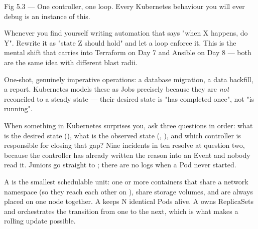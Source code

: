 \begin{wbfigure}{Fig 5.3 — One controller, one loop. Every Kubernetes behaviour you will ever debug is an instance of this.}
\end{wbfigure}

 Whenever you find yourself writing automation that says "when X happens, do Y". Rewrite it as "state Z should hold" and let a loop enforce it. This is the mental shift that carries into Terraform on Day 7 and Ansible on Day 8 --- both are the same idea with different blast radii.

 One-shot, genuinely imperative operations: a database migration, a data backfill, a report. Kubernetes models these as Jobs precisely because they are \emph{not} reconciled to a steady state --- their desired state is "has completed once", not "is running".

\begin{seniornote}
When something in Kubernetes surprises you, ask three questions in order: what is the desired state (), what is the observed state (, ), and which controller is responsible for closing that gap? Nine incidents in ten resolve at question two, because the controller has already written the reason into an Event and nobody read it. Juniors go straight to ; there are no logs when a Pod never started.
\end{seniornote}


 A  is the smallest schedulable unit: one or more containers that share a network namespace (so they reach each other on ), share storage volumes, and are always placed on one node together. A  keeps N identical Pods alive. A  owns ReplicaSets and orchestrates the transition from one to the next, which is what makes a rolling update possible.

